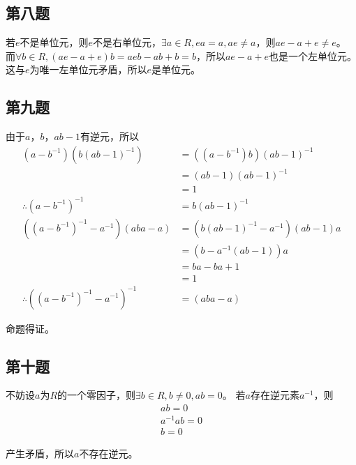 \documentclass[12pt,onecolumn]{article}
\theoremstyle{plain}
\begin{document}
\subsection{第八题}
\begin{proof*}
  若$e$不是单位元，则$e$不是右单位元，$\exists a \in R, ea = a, ae \neq a$，则$ae - a + e \neq e$。
  而$\forall b \in R, (ae - a + e)b = aeb - ab + b = b$，所以$ae - a + e$也是一个左单位元。
  这与$e$为唯一左单位元矛盾，所以$e$是单位元。
\end{proof*}

\subsection{第九题}
\begin{proof*}
  由于$a$，$b$，$ab - 1$有逆元，所以
  \begin{align*}
    (a - b^{-1})(b{(ab - 1)}^{-1}) &= ((a - b^{-1})b){(ab - 1)}^{-1} \\
                                   &=  (ab - 1){(ab - 1)}^{-1} \\
                                   &= 1 \\
    \therefore {(a - b^{-1})}^{-1} &= b{(ab - 1)}^{-1} \\
    ({(a - b^{-1})}^{-1} - a^{-1})(aba - a) &= (b{(ab - 1)}^{-1} - a^{-1})(ab - 1)a \\
                                   &=(b - a^{-1}(ab - 1))a \\
                                   &= ba - ba + 1 \\
                                   &= 1 \\
    \therefore {({(a - b^{-1})}^{-1} - a^{-1})}^{-1} &= (aba - a)
  \end{align*}

  命题得证。
\end{proof*}

\subsection{第十题}
\begin{proof*}
  不妨设$a$为$R$的一个零因子，则$\exists b \in R, b \neq 0, ab = 0$。
  若$a$存在逆元素$a^{-1}$，则
  \begin{gather*}
    ab = 0 \\
    a^{-1}ab = 0 \\
    b = 0
  \end{gather*}

  产生矛盾，所以$a$不存在逆元。
\end{proof*}
\end{document}
